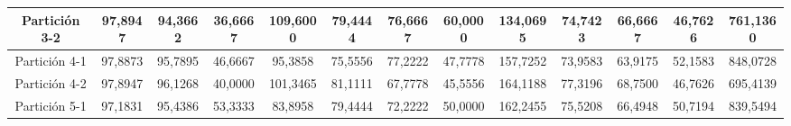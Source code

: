 \documentclass[12pt]{article}
\begin{document}
\begin{table}[H]
{\begin{tabular}{|c|cccc|cccc|cccc|}
Partición 3-2 & \multicolumn{1}{c|}{97,8947}                                                  & \multicolumn{1}{c|}{94,3662}                                                 & \multicolumn{1}{c|}{36,6667} & 109,6000 & \multicolumn{1}{c|}{79,4444}                                                  & \multicolumn{1}{c|}{76,6667}                                                 & \multicolumn{1}{c|}{60,0000} & 134,0695 & \multicolumn{1}{c|}{74,7423}                                                  & \multicolumn{1}{c|}{66,6667}                                                 & \multicolumn{1}{c|}{46,7626} & 761,1360 \\ \hline
Partición 4-1 & \multicolumn{1}{c|}{97,8873}                                                  & \multicolumn{1}{c|}{95,7895}                                                 & \multicolumn{1}{c|}{46,6667} & 95,3858  & \multicolumn{1}{c|}{75,5556}                                                  & \multicolumn{1}{c|}{77,2222}                                                 & \multicolumn{1}{c|}{47,7778} & 157,7252 & \multicolumn{1}{c|}{73,9583}                                                  & \multicolumn{1}{c|}{63,9175}                                                 & \multicolumn{1}{c|}{52,1583} & 848,0728 \\ \hline
Partición 4-2 & \multicolumn{1}{c|}{97,8947}                                                  & \multicolumn{1}{c|}{96,1268}                                                 & \multicolumn{1}{c|}{40,0000} & 101,3465 & \multicolumn{1}{c|}{81,1111}                                                  & \multicolumn{1}{c|}{67,7778}                                                 & \multicolumn{1}{c|}{45,5556} & 164,1188 & \multicolumn{1}{c|}{77,3196}                                                  & \multicolumn{1}{c|}{68,7500}                                                 & \multicolumn{1}{c|}{46,7626} & 695,4139 \\ \hline
Partición 5-1 & \multicolumn{1}{c|}{97,1831}                                                  & \multicolumn{1}{c|}{95,4386}                                                 & \multicolumn{1}{c|}{53,3333} & 83,8958  & \multicolumn{1}{c|}{79,4444}                                                  & \multicolumn{1}{c|}{72,2222}                                                 & \multicolumn{1}{c|}{50,0000} & 162,2455 & \multicolumn{1}{c|}{75,5208}                                                  & \multicolumn{1}{c|}{66,4948}                                                 & \multicolumn{1}{c|}{50,7194} & 839,5494 \\ \hline

\end{tabular}}
\end{table}
\end{document}
